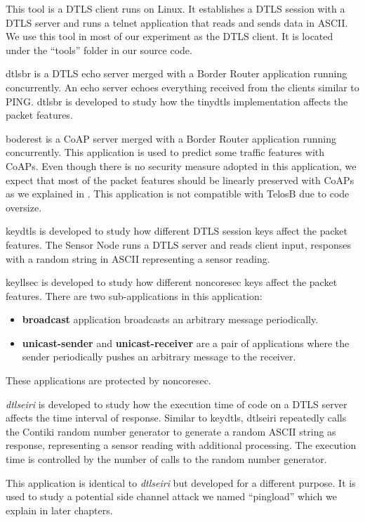 \begin{description}[style=nextline]

	\item[{dtls-telnet}]
	This tool is a DTLS client runs on Linux. It establishes a DTLS session with a DTLS server and runs a telnet application that reads and sends data in ASCII. We use this tool in most of our experiment as the DTLS client. It is located under the ``tools'' folder in our source code.
	
	\item[{dtlsbr}]
	{dtlsbr} is a DTLS echo server merged with a Border Router application running concurrently. An echo server echoes everything received from the clients similar to PING. {dtlsbr} is developed to study how the tinydtls implementation affects the packet features.
	
	\item[{borderest}]
	{boderest} is a CoAP server merged with a Border Router application running concurrently. This application is used to predict some traffic features with CoAPs. Even though there is no security measure adopted in this application, we expect that most of the packet features should be linearly preserved with CoAPs as we explained in . This application is not compatible with TelosB due to code oversize.
	
	\item[{keydtls}]
	{keydtls} is developed to study how different DTLS session keys affect the packet features. The Sensor Node runs a DTLS server and reads client input, responses with a random string in ASCII representing a sensor reading.
	
	\item[{keyllsec}]
	{keyllsec} is developed to study how different noncoresec keys affect the packet features. There are two sub-applications in this application:
	\begin{itemize}
		\item \textbf{broadcast} application broadcasts an arbitrary message periodically.
		\item \textbf{unicast-sender} and \textbf{unicast-receiver} are a pair of applications where the sender periodically pushes an arbitrary message to the receiver.
	\end{itemize}
	These applications are protected by noncoresec.

	\item[{dtlseiri}]
	\textit{dtlseiri} is developed to study how the execution time of code on a DTLS server affects the time interval of response. Similar to {keydtls}, {dtlseiri} repeatedly calls the Contiki random number generator to generate a random ASCII string as response, representing a sensor reading with additional processing. The execution time is controlled by the number of calls to the random number generator. 

	\item[{dtlspingload}]
	This application is identical to \textit{dtlseiri} but developed for a different purpose. It is used to study a potential side channel attack we named ``pingload'' which we explain in later chapters.
\end{description}

